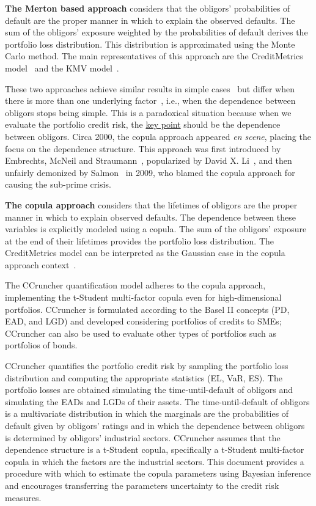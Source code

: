 \documentclass[11pt,fleqn]{book} %
\begin{document}
\textbf{The Merton based approach} considers that the obligors' probabilities 
of default are the proper manner in which to explain the observed defaults.
The sum of the obligors' exposure weighted by the probabilities of default 
derives the portfolio loss distribution. This distribution is approximated 
using the Monte Carlo method. The main representatives of this approach are the 
CreditMetrics\texttrademark{} model~\cite{cmetrics:1997} and the KMV 
model~\cite{kmv:2003}. 

These two approaches achieve similar results in simple cases~\cite{koyluoglu:1998}
but differ when there is more than one underlying factor~\cite{bluhm:2001}, 
i.e., when the dependence between obligors stops being simple.
This is a paradoxical situation because when we evaluate the portfolio credit 
risk, the \underline{key point} should be the dependence between obligors. 
Circa 2000, the copula approach appeared \textit{en scene}, placing the focus 
on the dependence structure. This approach was first introduced by Embrechts, 
McNeil and Straumann~\cite{embrechts:2002}, popularized by David X. Li~\cite{li:2000}, 
and then unfairly demonized by Salmon~\cite{salmon:2009} in 2009, who blamed 
the copula approach for causing the sub-prime crisis.

\textbf{The copula approach} considers that the lifetimes of obligors are
the proper manner in which to explain observed defaults. The dependence between 
these variables is explicitly modeled using a copula. The sum of the obligors' 
exposure at the end of their lifetimes provides the portfolio loss 
distribution. The CreditMetrics\texttrademark{} model can be interpreted as 
the Gaussian case in the copula approach context~\cite{li:2000}.

The CCruncher quantification model adheres to the copula approach, 
implementing the t-Student multi-factor copula even for high-dimensional 
portfolios. CCruncher is formulated according to the Basel II concepts 
(PD, EAD, and LGD) and developed considering portfolios of credits to SMEs;
CCruncher can also be used to evaluate other types of portfolios such as 
portfolios of bonds.

CCruncher quantifies the portfolio credit risk by sampling the portfolio loss
distribution and computing the appropriate statistics (EL, VaR, ES). The 
portfolio losses are obtained simulating the time-until-default of obligors 
and simulating the EADs and LGDs of their assets. The time-until-default of 
obligors is a multivariate distribution in which the marginals are the 
probabilities of default given by obligors' ratings and in which the dependence 
between obligors is determined by obligors' industrial sectors. CCruncher 
assumes that the dependence structure is a t-Student copula, specifically 
a t-Student multi-factor copula in which the factors are the industrial sectors.
This document provides a procedure with which to estimate the copula parameters 
using Bayesian inference and encourages transferring the parameters uncertainty
to the credit risk measures.
\end{document}
